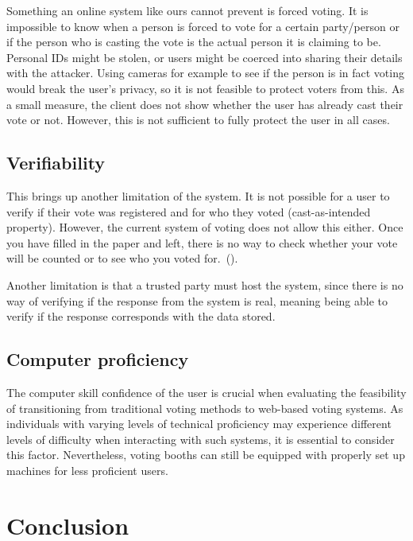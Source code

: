 \documentclass[a4paper,12pt,english]{article}
\begin{document}
Something an online system like ours cannot prevent is forced voting. It is impossible to know when a person is forced to vote for a certain party/person or if the person who is casting the vote is the actual person it is claiming to be. Personal IDs might be stolen, or users might be coerced into sharing their details with the attacker. Using cameras for example to see if the person is in fact voting would break the user’s privacy, so it is not feasible to protect voters from this. As a small measure, the client does not show whether the user has already cast their vote or not. However, this is not sufficient to fully protect the user in all cases.

\subsection{Verifiability}\label{sec:limit-verifiability}

This brings up another limitation of the system. It is not possible for a user to verify if their vote was registered and for who they voted (cast-as-intended property). However, the current system of voting does not allow this either. Once you have filled in the paper and left, there is no way to check whether your vote will be counted or to see who you voted for.~(\cite{cryptoeprint:2016/287}).

Another limitation is that a trusted party must host the system, since there is no way of verifying if the response from the system is real, meaning being able to verify if the response corresponds with the data stored.

\subsection{Computer proficiency}\label{sec:limit-proficiency}

The computer skill confidence of the user is crucial when evaluating the feasibility of transitioning from traditional voting methods to web-based voting systems. As individuals with varying levels of technical proficiency may experience different levels of difficulty when interacting with such systems, it is essential to consider this factor. Nevertheless, voting booths can still be equipped with properly set up machines for less proficient users.

\section{Conclusion}\label{sec:conclusion}
\end{document}
